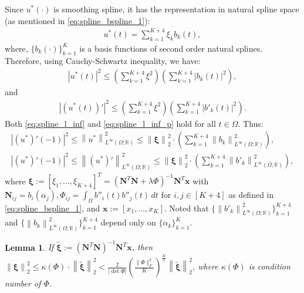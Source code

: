 \documentclass{article}
\newtheorem{lemma}{Lemma}
\newcommand{\norm}[1]{\left\lVert#1\right\rVert}
\newcommand{\lp}[1]{{L}^{#1}\left(\Omega; \mathbb{R}\right)}
\begin{document}
Since $u^*(\cdot)$ is smoothing spline, it has the representation in natural spline space (as mentioned in \eqref{eq:spline_bspline_1}):
\begin{align}
    u^*(t) = \sum^{K+4}_{k=1} \xi_kb_k(t),
\end{align}
where, $\{b_k(\cdot)\}^K_{k=1}$ is a basis functions of second order natural splines. Therefore, using Cauchy-Schwartz inequality, we have:
\begin{align} \label{eq:spline_l_inf}
    |u^*(t)|^2 \leqslant \left(\sum^{K+4}_{k=1} \xi^2 \right) \left(\sum^{K+4}_{k=1}|b_k(t)|^2\right),
\end{align}
and
\begin{align}\label{eq:spline_l_inf_p}
    |(u^*(t))'|^2 \leqslant \left(\sum^{K+4}_{k=1} \xi^2 \right) \left(\sum^{K+4}_{k=1}|b'_k(t)|^2\right).
\end{align}
Both \eqref{eq:spline_l_inf} and \eqref{eq:spline_l_inf_p} hold for all $t \in \Omega$. Thus:
\begin{align}\label{eq:spline_l_inf_2}
    |(u^*)'(-1)|^2 \leqslant \norm{u^*}^2_{\lp{\infty}} \leqslant \norm{\boldsymbol{\xi}}^2_2 \cdot \left(\sum^{K+4}_{k=1}\norm{b_k}^2_{\lp{\infty}}\right), \\ \label{eq:spline_l_inf_p_2}
    |(u^*)'(-1)|^2 \leqslant \norm{(u^*)'}^2_{\lp{\infty}} \leqslant \norm{\boldsymbol{\xi}}^2_2 \cdot \left(\sum^{K+4}_{k=1}\norm{b'_k}^2_{\lp{\infty}}\right),
\end{align}
where $\boldsymbol{\xi}:=[\xi_1,\dots,\xi_{K+4}]^T = \left(\mathbf{N}^T\mathbf{N} + \lambda\Phi\right)^{-1}\mathbf{N}^T\mathbf{x}$ with $\mathbf{N}_{ij} = b_i(\alpha_j), \Phi_{ij} = \int_\Omega b''_i(t)b''_j(t)\,dt$ for $i, j \in [{K+4}]$ as defined in \eqref{eq:spline_bspline_1}, and $\mathbf{x}:=[x_1,\dots,x_K]$. Noted that $\{\norm{b'_k}^2_{\lp{\infty}}\}_{k=1}^{K+4}$ and $\{\norm{b_k}^2_{\lp{\infty}}\}_{k=1}^{K+4}$ depend only on $\{\alpha_k\}_{k=1}^K$.
\begin{lemma}\label{lem:ridge_reg_weight_upperbound} If $\boldsymbol{\widetilde{\xi}}:=\left(\mathbf{N}^T\mathbf{N}\right)^{-1}\mathbf{N}^T\mathbf{x}$, then $\norm{\boldsymbol{\xi}}^2_2 \leqslant \kappa(\Phi)\cdot \norm{\boldsymbol{\widetilde{\xi}}}^2_2 <\frac{2}{|\operatorname{det} \Phi|}\left(\frac{\|\Phi\|_F^2}{K}\right)^{\frac{K}{2}} \norm{\boldsymbol{\widetilde{\xi}}}^2_2$, where $\kappa(\Phi)$ is condition number of $\Phi$.
\end{lemma}
\end{document}
